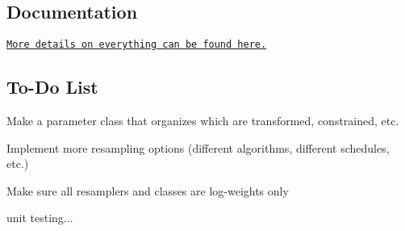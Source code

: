 \subsection*{Documentation}

\href{https://tbrown122387.github.io/ssm/}{\tt More details on everything can be found here.}

\subsection*{To-\/\+Do List}


\begin{DoxyItemize}
\item Make a parameter class that organizes which are transformed, constrained, etc.
\item Implement more resampling options (different algorithms, different schedules, etc.)
\item Make sure all resamplers and classes are log-\/weights only
\item unit testing... 
\end{DoxyItemize}